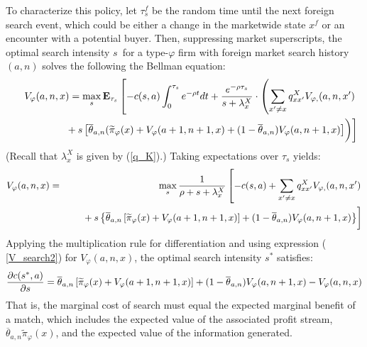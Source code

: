 To characterize this policy, let $\tau _{s}^{f}$ be the random time until
the next foreign search event, which could be either a change in the
marketwide state $x^{f}$ or an encounter with a potential buyer. Then,
suppressing market superscripts, the optimal search intensity $s$\ for a
type-$\varphi $ firm with foreign market search history $(a,n)$ solves the
following the Bellman equation:%
\begin{eqnarray*}
&&V_{\varphi }(a,n,x)=\max_{s}\mathbf{E}_{\tau _{s}}\left[
-c(s,a)\int_{0}^{\tau _{s}}e^{-\rho t}dt+\frac{e^{-\rho \tau _{s}}}{%
s+\lambda _{x}^{X}}\cdot \left( \sum_{x^{\prime }\neq x}q_{xx^{\prime
}}^{X}V_{\varphi ,}(a,n,x^{\prime })\right. \right. \\
\; &&\left. \left. 
\begin{array}{c}
\; \\ 
\;%
\end{array}%
+s\left[ \overline{\theta }_{a,n}(\widetilde{\pi }_{\varphi }(x)+V_{\varphi
}(a+1,n+1,x)+(1-\overline{\theta }_{a,n})V_{\varphi }(a,n+1,x)\right]
\right) \right]
\end{eqnarray*}%
(Recall that $\lambda _{x}^{X}$ is given by (\ref{q_K}).) Taking
expectations over $\tau _{s}$ yields:%
\begin{eqnarray}
V_{\varphi }(a,n,x) &=&\max_{s}\frac{1}{\rho +s+\lambda _{x}^{X}}\left[
-c(s,a)+\sum_{x^{\prime }\neq x}q_{xx^{\prime }}^{X}V_{\varphi
,}(a,n,x^{\prime })\right.  \label{V_search2} \\
&&\left. 
\begin{array}{c}
\; \\ 
\;%
\end{array}%
+s\left\{ \overline{\theta }_{a,n}\left[ \widetilde{\pi }_{\varphi
}(x)+V_{\varphi }(a+1,n+1,x)\right] +(1-\overline{\theta }_{a,n})V_{\varphi
}(a,n+1,x)\right\} \right]  \notag
\end{eqnarray}%
Applying the multiplication rule for differentiation and using expression (%
\ref{V_search2}) for $V_{\varphi }(a,n,x)$, the optimal search intensity $%
s^{\ast }$ satisfies:%
\begin{equation}
\frac{\partial c(s^{\ast },a)}{\partial s}=\overline{\theta }_{a,n}\left[ 
\widetilde{\pi }_{\varphi }(x)+V_{\varphi }(a+1,n+1,x)\right] +(1-\overline{%
\theta }_{a,n})V_{\varphi }(a,n+1,x)-V_{\varphi }(a,n,x)
\label{FOC_MS_learning}
\end{equation}%
That is, the marginal cost of search must equal the expected marginal
benefit of a match, which includes the expected value of the associated
profit stream, $\overline{\theta }_{a,n}\widetilde{\pi }_{\varphi }(x)$, and
the expected value of the information generated.

